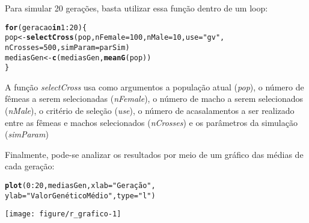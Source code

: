 \documentclass{article}\usepackage[]{graphicx}\usepackage[]{xcolor}
\makeatletter
\def\maxwidth{ %
  \ifdim\Gin@nat@width>\linewidth
    \linewidth
  \else
    \Gin@nat@width
  \fi
}
\newcommand{\hlnum}[1]{\textcolor[rgb]{0.686,0.059,0.569}{#1}}%
\newcommand{\hlstr}[1]{\textcolor[rgb]{0.192,0.494,0.8}{#1}}%
\newcommand{\hlopt}[1]{\textcolor[rgb]{0,0,0}{#1}}%
\newcommand{\hlstd}[1]{\textcolor[rgb]{0.345,0.345,0.345}{#1}}%
\newcommand{\hlkwa}[1]{\textcolor[rgb]{0.161,0.373,0.58}{\textbf{#1}}}%
\newcommand{\hlkwb}[1]{\textcolor[rgb]{0.69,0.353,0.396}{#1}}%
\newcommand{\hlkwc}[1]{\textcolor[rgb]{0.333,0.667,0.333}{#1}}%
\newcommand{\hlkwd}[1]{\textcolor[rgb]{0.737,0.353,0.396}{\textbf{#1}}}%
\newenvironment{kframe}{%
 \def\at@end@of@kframe{}%
 \ifinner\ifhmode%
  \def\at@end@of@kframe{\end{minipage}}%
  \begin{minipage}{\columnwidth}%
 \fi\fi%
 \def\FrameCommand##1{\hskip\@totalleftmargin \hskip-\fboxsep
 \colorbox{shadecolor}{##1}\hskip-\fboxsep
     \hskip-\linewidth \hskip-\@totalleftmargin \hskip\columnwidth}%
 \MakeFramed {\advance\hsize-\width
   \@totalleftmargin\z@ \linewidth\hsize
   \@setminipage}}%
 {\par\unskip\endMakeFramed%
 \at@end@of@kframe}
\newenvironment{knitrout}{}{} %
\makeatother
\begin{document}
Para simular 20 gerações, basta utilizar essa função dentro de um loop:
\begin{knitrout}
\color{fgcolor}\begin{kframe}
\begin{alltt}
\hlkwa{for}\hlstd{(geracao} \hlkwa{in} \hlnum{1}\hlopt{:}\hlnum{20}\hlstd{)\{}
  \hlstd{pop}\hlkwb{<-}\hlkwd{selectCross}\hlstd{(pop,}\hlkwc{nFemale} \hlstd{=} \hlnum{100}\hlstd{,} \hlkwc{nMale} \hlstd{=} \hlnum{10}\hlstd{,} \hlkwc{use} \hlstd{=} \hlstr{"gv"}\hlstd{,}
                   \hlkwc{nCrosses} \hlstd{=} \hlnum{500}\hlstd{,} \hlkwc{simParam} \hlstd{= parSim)}
  \hlstd{mediasGen}\hlkwb{<-}\hlkwd{c}\hlstd{(mediasGen,} \hlkwd{meanG}\hlstd{(pop))}
\hlstd{\}}
\end{alltt}
\end{kframe}
\end{knitrout}

A função \emph{selectCross} usa como argumentos a população atual (\emph{pop}), o número de fêmeas a serem selecionadas (\emph{nFemale}), o número de macho a serem selecionados (\emph{nMale}), o critério de seleção (\emph{use}), o número de acasalamentos a ser realizado entre as fêmeas e machos selecionados (\emph{nCrosses}) e os parâmetros da simulação (\emph{simParam})

Finalmente, pode-se analizar os resultados por meio de um gráfico das médias de cada geração:
\begin{knitrout}
\color{fgcolor}\begin{kframe}
\begin{alltt}
\hlkwd{plot}\hlstd{(}\hlnum{0}\hlopt{:}\hlnum{20}\hlstd{, mediasGen,} \hlkwc{xlab} \hlstd{=} \hlstr{"Geração"}\hlstd{,}
     \hlkwc{ylab} \hlstd{=} \hlstr{"Valor Genético Médio"}\hlstd{,} \hlkwc{type} \hlstd{=} \hlstr{"l"}\hlstd{)}
\end{alltt}
\end{kframe}
\texttt{[image: figure/r\_grafico-1]} 
\end{knitrout}
\end{document}
